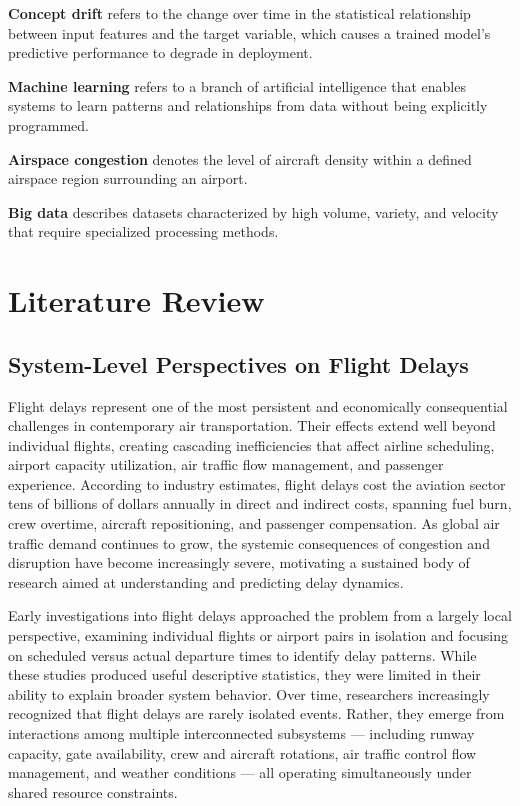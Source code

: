 \documentclass{report}
\begin{document}
\textbf{Concept drift} refers to the change over time in the statistical relationship between input features and the target variable, which causes a trained model's predictive performance to degrade in deployment.

\textbf{Machine learning} refers to a branch of artificial intelligence that enables systems to learn patterns and relationships from data without being explicitly programmed.

\textbf{Airspace congestion} denotes the level of aircraft density within a defined airspace region surrounding an airport.

\textbf{Big data} describes datasets characterized by high volume, variety, and velocity that require specialized processing methods.



\chapter{Literature Review}

\section{System-Level Perspectives on Flight Delays}

Flight delays represent one of the most persistent and economically consequential challenges in contemporary air transportation. Their effects extend well beyond individual flights, creating cascading inefficiencies that affect airline scheduling, airport capacity utilization, air traffic flow management, and passenger experience. According to industry estimates, flight delays cost the aviation sector tens of billions of dollars annually in direct and indirect costs, spanning fuel burn, crew overtime, aircraft repositioning, and passenger compensation. As global air traffic demand continues to grow, the systemic consequences of congestion and disruption have become increasingly severe, motivating a sustained body of research aimed at understanding and predicting delay dynamics.

Early investigations into flight delays approached the problem from a largely local perspective, examining individual flights or airport pairs in isolation and focusing on scheduled versus actual departure times to identify delay patterns. While these studies produced useful descriptive statistics, they were limited in their ability to explain broader system behavior. Over time, researchers increasingly recognized that flight delays are rarely isolated events. Rather, they emerge from interactions among multiple interconnected subsystems --- including runway capacity, gate availability, crew and aircraft rotations, air traffic control flow management, and weather conditions --- all operating simultaneously under shared resource constraints.
\end{document}
